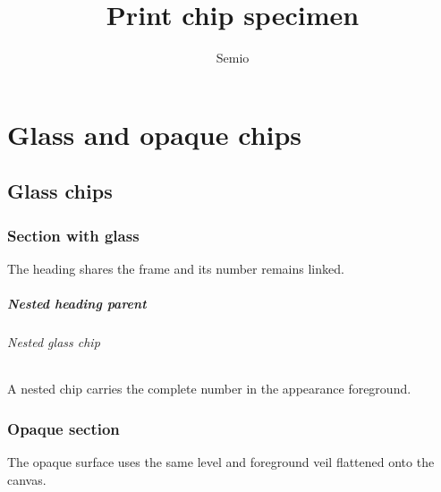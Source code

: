 \documentclass[type=report,theme=dark,language=en]{semio}
\title{Print chip specimen}
\author{Semio}
\begin{document}
\part{Glass and opaque chips}
\chapter{Glass chips}
\section{Section with glass}
The heading shares the frame and its number remains linked.
\subsubsection{Nested heading parent}
\begin{SemioNest}
\paragraph{Nested glass chip}
A nested chip carries the complete number in the appearance foreground.
\end{SemioNest}
\newpage
{}
\section{Opaque section}
The opaque surface uses the same level and foreground veil flattened onto the canvas.
\end{document}
